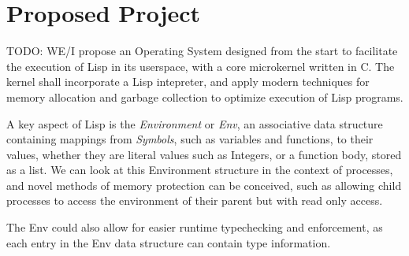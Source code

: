 \documentclass{article}
\begin{document}
  
  \section{Proposed Project}
  \iffalse
  OS with a lisp interpreter embedded in the kernel
  same model as emacs, C core, Lisp everything else

  why lisp? can be functional and imperative, in kernel repl, \\
  excellent ast manipulation and code gen (JIT and language support) \\
  safe language, removes needs for mem protection the same way

  process model splitting code and env \\
  heirarchical env layering between processes ensures safety \\
  env for low level, requires special permissions \\

  use mem layering to help concurrent GC

  \begin{itemize}
  \item Minimum Spec \\
    basic OS, with multitasking and shell interface, LISP repl in kernel
  \item Mid Spec \\
    LISP process model, simple gui, filesystem, mark and sweep gc
  \item Ultra DX Re:Master Spec \\
    dual LISP code / JITed code process model, JIT compiler in kernel, concurrent gc
  \end{itemize}
  \fi

  TODO: WE/I propose an Operating System designed from the start to facilitate the execution of Lisp in its userspace, with a core microkernel written in C. The kernel shall incorporate a Lisp intepreter, and apply modern techniques for memory allocation and garbage collection to optimize execution of Lisp programs.
  \par
  A key aspect of Lisp is the \textit{Environment} or \textit{Env}, an associative data structure containing mappings from \textit{Symbols}, such as variables and functions, to their values, whether they are literal values such as Integers, or a function body, stored as a list. We can look at this Environment structure in the context of processes, and novel methods of memory protection can be conceived, such as allowing child processes to access the environment of their parent but with read only access.
  \par
  The Env could also allow for easier runtime typechecking and enforcement, as each entry in the Env data structure can contain type information.
  \par
\end{document}
